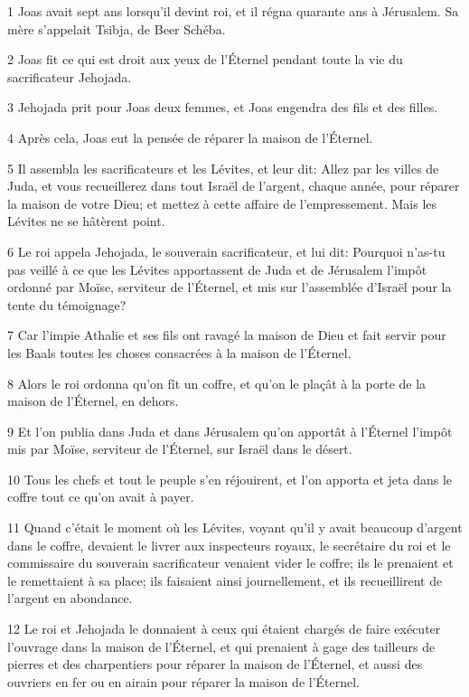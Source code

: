 \par 1 Joas avait sept ans lorsqu'il devint roi, et il régna quarante ans à Jérusalem. Sa mère s'appelait Tsibja, de Beer Schéba.
\par 2 Joas fit ce qui est droit aux yeux de l'Éternel pendant toute la vie du sacrificateur Jehojada.
\par 3 Jehojada prit pour Joas deux femmes, et Joas engendra des fils et des filles.
\par 4 Après cela, Joas eut la pensée de réparer la maison de l'Éternel.
\par 5 Il assembla les sacrificateurs et les Lévites, et leur dit: Allez par les villes de Juda, et vous recueillerez dans tout Israël de l'argent, chaque année, pour réparer la maison de votre Dieu; et mettez à cette affaire de l'empressement. Mais les Lévites ne se hâtèrent point.
\par 6 Le roi appela Jehojada, le souverain sacrificateur, et lui dit: Pourquoi n'as-tu pas veillé à ce que les Lévites apportassent de Juda et de Jérusalem l'impôt ordonné par Moïse, serviteur de l'Éternel, et mis sur l'assemblée d'Israël pour la tente du témoignage?
\par 7 Car l'impie Athalie et ses fils ont ravagé la maison de Dieu et fait servir pour les Baals toutes les choses consacrées à la maison de l'Éternel.
\par 8 Alors le roi ordonna qu'on fît un coffre, et qu'on le plaçât à la porte de la maison de l'Éternel, en dehors.
\par 9 Et l'on publia dans Juda et dans Jérusalem qu'on apportât à l'Éternel l'impôt mis par Moïse, serviteur de l'Éternel, sur Israël dans le désert.
\par 10 Tous les chefs et tout le peuple s'en réjouirent, et l'on apporta et jeta dans le coffre tout ce qu'on avait à payer.
\par 11 Quand c'était le moment où les Lévites, voyant qu'il y avait beaucoup d'argent dans le coffre, devaient le livrer aux inspecteurs royaux, le secrétaire du roi et le commissaire du souverain sacrificateur venaient vider le coffre; ils le prenaient et le remettaient à sa place; ils faisaient ainsi journellement, et ils recueillirent de l'argent en abondance.
\par 12 Le roi et Jehojada le donnaient à ceux qui étaient chargés de faire exécuter l'ouvrage dans la maison de l'Éternel, et qui prenaient à gage des tailleurs de pierres et des charpentiers pour réparer la maison de l'Éternel, et aussi des ouvriers en fer ou en airain pour réparer la maison de l'Éternel.
